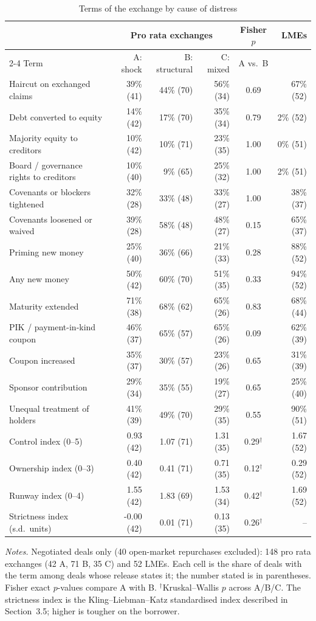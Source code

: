 \begin{table}[htbp]\centering
\caption{Terms of the exchange by cause of distress}
\label{tab:terms}
\small
\begin{tabular}{l rrr c r}
\toprule
 & \multicolumn{3}{c}{Pro rata exchanges} & Fisher $p$ & LMEs \\
 \cmidrule(lr){2-4}
Term & A: shock & B: structural & C: mixed & A vs.\ B &  \\
\midrule
Haircut on exchanged claims & 39\% (41) & 44\% (70) & 56\% (34) & 0.69 & 67\% (52) \\
Debt converted to equity & 14\% (42) & 17\% (70) & 35\% (34) & 0.79 & 2\% (52) \\
Majority equity to creditors & 10\% (42) & 10\% (71) & 23\% (35) & 1.00 & 0\% (51) \\
Board / governance rights to creditors & 10\% (40) & 9\% (65) & 25\% (32) & 1.00 & 2\% (51) \\
Covenants or blockers tightened & 32\% (28) & 33\% (48) & 33\% (27) & 1.00 & 38\% (37) \\
Covenants loosened or waived & 39\% (28) & 58\% (48) & 48\% (27) & 0.15 & 65\% (37) \\
Priming new money & 25\% (40) & 36\% (66) & 21\% (33) & 0.28 & 88\% (52) \\
Any new money & 50\% (42) & 60\% (70) & 51\% (35) & 0.33 & 94\% (52) \\
Maturity extended & 71\% (38) & 68\% (62) & 65\% (26) & 0.83 & 68\% (44) \\
PIK / payment-in-kind coupon & 46\% (37) & 65\% (57) & 65\% (26) & 0.09 & 62\% (39) \\
Coupon increased & 35\% (37) & 30\% (57) & 23\% (26) & 0.65 & 31\% (39) \\
Sponsor contribution & 29\% (34) & 35\% (55) & 19\% (27) & 0.65 & 25\% (40) \\
Unequal treatment of holders & 41\% (39) & 49\% (70) & 29\% (35) & 0.55 & 90\% (51) \\
\midrule
Control index (0--5) & 0.93 (42) & 1.07 (71) & 1.31 (35) & 0.29$^{\dagger}$ & 1.67 (52) \\
Ownership index (0--3) & 0.40 (42) & 0.41 (71) & 0.71 (35) & 0.12$^{\dagger}$ & 0.29 (52) \\
Runway index (0--4) & 1.55 (42) & 1.83 (69) & 1.53 (34) & 0.42$^{\dagger}$ & 1.69 (52) \\
Strictness index (s.d.\ units) & -0.00 (42) & 0.01 (71) & 0.13 (35) & 0.26$^{\dagger}$ & -- \\
\bottomrule
\end{tabular}
\begin{minipage}{0.95\textwidth}\vspace{4pt}\footnotesize
\textit{Notes.} Negotiated deals only (40 open-market repurchases excluded): 148 pro rata exchanges (42 A, 71 B, 35 C) and 52 LMEs. Each cell is the share of deals with the term among deals whose release states it; the number stated is in parentheses. Fisher exact $p$-values compare A with B. $^{\dagger}$Kruskal--Wallis $p$ across A/B/C. The strictness index is the Kling--Liebman--Katz standardised index described in Section~3.5; higher is tougher on the borrower.
\end{minipage}
\end{table}